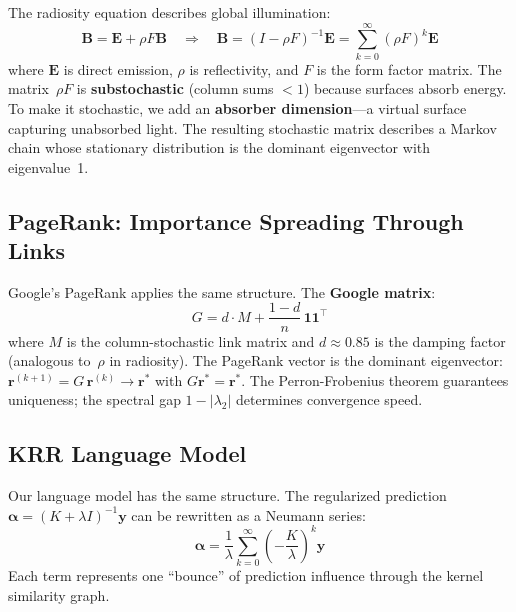 \documentclass[11pt,a4paper]{article}
\begin{document}
The radiosity equation describes global illumination:
\begin{equation}\label{eq:radiosity}
  \mathbf{B} = \mathbf{E} + \rho F \mathbf{B}
  \quad\Longrightarrow\quad
  \mathbf{B} = (I - \rho F)^{-1} \mathbf{E}
  = \sum_{k=0}^{\infty} (\rho F)^k \mathbf{E}
\end{equation}
where $\mathbf{E}$ is direct emission, $\rho$ is reflectivity, and $F$ is the form factor matrix. The matrix~$\rho F$ is \textbf{substochastic} (column sums $< 1$) because surfaces absorb energy. To make it stochastic, we add an \textbf{absorber dimension}---a virtual surface capturing unabsorbed light. The resulting stochastic matrix describes a Markov chain whose stationary distribution is the dominant eigenvector with eigenvalue~1.

\subsection{PageRank: Importance Spreading Through Links}

Google's PageRank \citep{page1998pagerank} applies the same structure. The \textbf{Google matrix}:
\begin{equation}\label{eq:google}
  G = d \cdot M + \frac{1-d}{n}\,\mathbf{1}\mathbf{1}^\top
\end{equation}
where $M$ is the column-stochastic link matrix and $d \approx 0.85$ is the damping factor (analogous to~$\rho$ in radiosity). The PageRank vector is the dominant eigenvector: $\mathbf{r}^{(k+1)} = G\,\mathbf{r}^{(k)} \to \mathbf{r}^*$ with $G\mathbf{r}^* = \mathbf{r}^*$. The Perron-Frobenius theorem guarantees uniqueness; the spectral gap $1 - |\lambda_2|$ determines convergence speed.

\subsection{KRR Language Model}

Our language model has the same structure. The regularized prediction $\boldsymbol{\alpha} = (K + \lambda I)^{-1} \mathbf{y}$ can be rewritten as a Neumann series:
\begin{equation}
  \boldsymbol{\alpha} = \frac{1}{\lambda}\sum_{k=0}^{\infty} \left(-\frac{K}{\lambda}\right)^k \mathbf{y}
\end{equation}
Each term represents one ``bounce'' of prediction influence through the kernel similarity graph.
\end{document}
